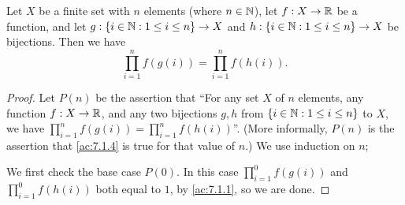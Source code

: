 \begin{ac}\label{ac:7.1.4}
  Let \(X\) be a finite set with \(n\) elements (where \(n \in \mathbb{N}\)), let \(f : X \to \mathbb{R}\) be a function, and let \(g : \left\lbrace i \in \mathbb{N} : 1 \leq i \leq n\right\rbrace \to X\) and \(h : \left\lbrace i \in \mathbb{N} : 1 \leq i \leq n\right\rbrace \to X\) be bijections.
  Then we have
  \[
    \prod_{i = 1}^n f(g(i)) = \prod_{i = 1}^n f(h(i)).
  \]
\end{ac}

\begin{proof}
  Let \(P(n)\) be the assertion that ``For any set \(X\) of \(n\) elements, any function \(f : X \to \mathbb{R}\), and any two bijections \(g, h\) from \(\left\lbrace i \in \mathbb{N} : 1 \leq i \leq n\right\rbrace\) to \(X\), we have \(\prod_{i = 1}^n f(g(i)) = \prod_{i = 1}^n f(h(i))\)''.
  (More informally, \(P(n)\) is the assertion that \cref{ac:7.1.4} is true for that value of \(n\).)
  We use induction on \(n\);

  We first check the base case \(P(0)\).
  In this case \(\prod_{i = 1}^0 f(g(i))\) and \(\prod_{i = 1}^0 f(h(i))\) both equal to \(1\), by \cref{ac:7.1.1}, so we are done.


\end{proof}
